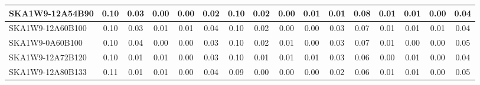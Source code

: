 \begin{table}[H]
{{\begin{tabular}{|lccccc||ccccc||ccccc|}
SKA1W9-12A54B90 & 0.10 \cellcolor{blue!18.00} & 0.03 \cellcolor{red!46.00} & 0.00 \cellcolor{green!18.00} & 0.00 \cellcolor{orange!18.00} & 0.02 \cellcolor{purple!18.00} & 0.10 \cellcolor{blue!39.00} & 0.02 \cellcolor{red!46.00} & 0.00 \cellcolor{green!18.00} & 0.01 \cellcolor{orange!60.00} & 0.01 \cellcolor{purple!18.00} & 0.08 \cellcolor{blue!60.00} & 0.01 \cellcolor{red!39.00} & 0.01 \cellcolor{green!60.00} & 0.00 \cellcolor{orange!18.00} & 0.04 \cellcolor{purple!18.00}\\ \hline 
SKA1W9-12A60B100 & 0.10 \cellcolor{blue!18.00} & 0.03 \cellcolor{red!46.00} & 0.01 \cellcolor{green!39.00} & 0.01 \cellcolor{orange!60.00} & 0.04 \cellcolor{purple!46.00} & 0.10 \cellcolor{blue!39.00} & 0.02 \cellcolor{red!46.00} & 0.00 \cellcolor{green!18.00} & 0.00 \cellcolor{orange!18.00} & 0.03 \cellcolor{purple!60.00} & 0.07 \cellcolor{blue!39.00} & 0.01 \cellcolor{red!39.00} & 0.01 \cellcolor{green!60.00} & 0.01 \cellcolor{orange!60.00} & 0.04 \cellcolor{purple!18.00}\\ \hline 
SKA1W9-0A60B100 & 0.10 \cellcolor{blue!18.00} & 0.04 \cellcolor{red!60.00} & 0.00 \cellcolor{green!18.00} & 0.00 \cellcolor{orange!18.00} & 0.03 \cellcolor{purple!32.00} & 0.10 \cellcolor{blue!39.00} & 0.02 \cellcolor{red!46.00} & 0.01 \cellcolor{green!60.00} & 0.00 \cellcolor{orange!18.00} & 0.03 \cellcolor{purple!60.00} & 0.07 \cellcolor{blue!39.00} & 0.01 \cellcolor{red!39.00} & 0.00 \cellcolor{green!18.00} & 0.00 \cellcolor{orange!18.00} & 0.05 \cellcolor{purple!32.00}\\ \hline 
SKA1W9-12A72B120 & 0.10 \cellcolor{blue!18.00} & 0.01 \cellcolor{red!18.00} & 0.01 \cellcolor{green!39.00} & 0.00 \cellcolor{orange!18.00} & 0.03 \cellcolor{purple!32.00} & 0.10 \cellcolor{blue!39.00} & 0.01 \cellcolor{red!32.00} & 0.01 \cellcolor{green!60.00} & 0.01 \cellcolor{orange!60.00} & 0.03 \cellcolor{purple!60.00} & 0.06 \cellcolor{blue!18.00} & 0.00 \cellcolor{red!18.00} & 0.01 \cellcolor{green!60.00} & 0.00 \cellcolor{orange!18.00} & 0.04 \cellcolor{purple!18.00}\\ \hline 
SKA1W9-12A80B133 & 0.11 \cellcolor{blue!39.00} & 0.01 \cellcolor{red!18.00} & 0.01 \cellcolor{green!39.00} & 0.00 \cellcolor{orange!18.00} & 0.04 \cellcolor{purple!46.00} & 0.09 \cellcolor{blue!18.00} & 0.00 \cellcolor{red!18.00} & 0.00 \cellcolor{green!18.00} & 0.00 \cellcolor{orange!18.00} & 0.02 \cellcolor{purple!39.00} & 0.06 \cellcolor{blue!18.00} & 0.01 \cellcolor{red!39.00} & 0.01 \cellcolor{green!60.00} & 0.00 \cellcolor{orange!18.00} & 0.05 \cellcolor{purple!32.00}\\ \hline 

\end{tabular}}}
\end{table}
